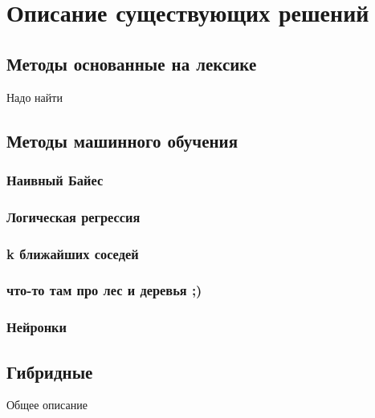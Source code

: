 \chapter{Описание существующих решений}

\section{Методы основанные на лексике}

Надо найти

\section{Методы машинного обучения}

\subsection{Наивный Байес}

\subsection{Логическая регрессия}

\subsection{k ближайших соседей}

\subsection{что-то там про лес и деревья ;)}

\subsection{Нейронки}

\section{Гибридные}

Общее описание
